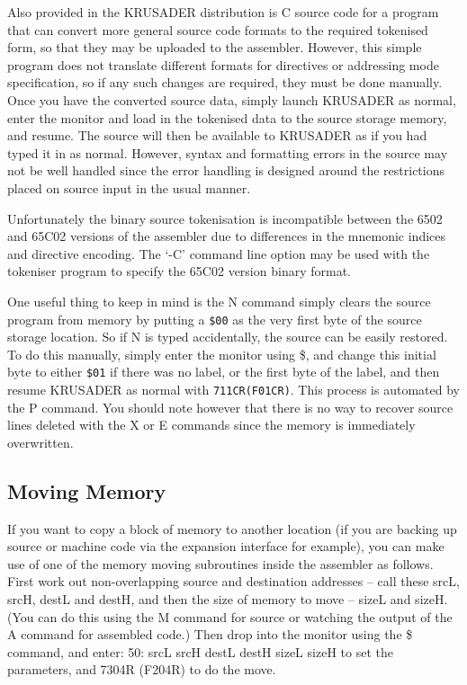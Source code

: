 \documentclass[12pt]{article}
\newcommand{\replica}[1]{\textsf{#1}}
\newcommand{\krusader}{\textsf{KRUSADER}\xspace}
\begin{document}
Also provided in the \krusader distribution is C source code for a program that can
convert more general source code formats to the required tokenised form, so that they
may be uploaded to the assembler.  However, this simple program does not translate
different formats for directives or addressing mode specification, so if any
such changes are required, they must be done manually. 
Once you have the converted source data, simply 
launch \krusader as normal, enter the monitor and load in the tokenised data to the
source storage memory, and resume.  The source will then be available to \krusader
as if you had typed it in as normal.  However, syntax and formatting errors in the source may not be well handled
since the error handling is designed around the restrictions placed on source input in the
usual manner.

Unfortunately the binary source tokenisation is incompatible between the 6502 and 65C02 versions of the
assembler due to differences in the mnemonic indices and directive encoding. The `-C’ command line option
may be used with the tokeniser program to specify the 65C02 version binary format.

One useful thing to keep in mind is the \replica{N} command simply clears the source program
from memory by putting a \texttt{\$00} as the very first byte of the source storage location.
So if \replica{N} is typed accidentally, the source can be easily restored.  To do this manually, simply enter
the monitor using \replica{\$}, and change this initial byte to either \texttt{\$01} if there was no
label, or the first byte of the label, and then resume \krusader as normal with \texttt{711CR(F01CR)}.
This process is automated by the \replica{P} command.
You should note however that there is no way to recover source lines deleted with the
\replica{X} or \replica{E} commands since the memory is immediately overwritten.

\subsection{Moving Memory}

If you want to copy a block of memory to another location (if you are backing up source 
or machine code via the expansion interface for example), you can make use of one
of the memory moving subroutines inside the assembler as follows.  First work out non-overlapping source
and destination addresses -- call these \replica{srcL, srcH, destL} and \replica{destH}, and then
the size of memory to move -- \replica{sizeL} and \replica{sizeH}.  
(You can do this using the \replica{M} command for 
source or watching the output of the \replica{A} command for assembled code.)  Then drop into the 
monitor using the \replica{\$} command, and enter:
\replica{50: srcL srcH destL destH sizeL sizeH}
to set the parameters, and \replica{7304R} (\replica{F204R}) to do the move.
\end{document}
